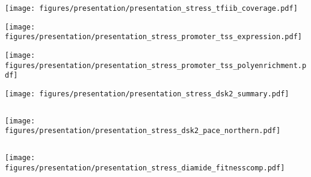 \documentclass[aspectratio=169, 12pt]{beamer}
\begin{document}
\begin{frame}
    \texttt{[image: figures/presentation/presentation\_stress\_tfiib\_coverage.pdf]}
\end{frame}

\begin{frame}[t]
    \texttt{[image: figures/presentation/presentation\_stress\_promoter\_tss\_expression.pdf]}
\end{frame}

\begin{frame}[t]
    \texttt{[image: figures/presentation/presentation\_stress\_promoter\_tss\_polyenrichment.pdf]}
\end{frame}

\begin{frame}[t]
    \texttt{[image: figures/presentation/presentation\_stress\_dsk2\_summary.pdf]}
\end{frame}

\begin{frame}
    \begin{columns}
        \begin{column}{0.5\textwidth}
            \texttt{[image: figures/presentation/presentation\_stress\_dsk2\_pace\_northern.pdf]}
        \end{column}
        \begin{column}{0.5\textwidth}
        \end{column}
    \end{columns}
\end{frame}

\begin{frame}
    \texttt{[image: figures/presentation/presentation\_stress\_diamide\_fitnesscomp.pdf]}
\end{frame}
\end{document}
